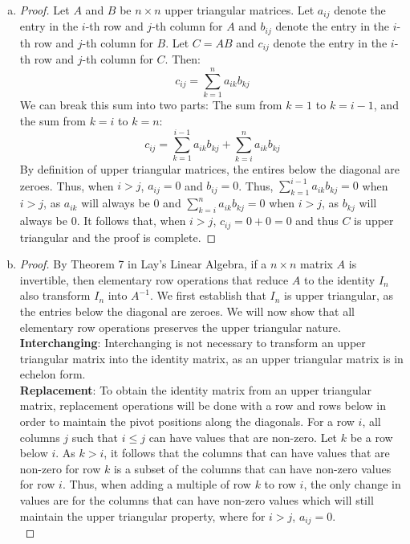 \documentclass[11pt]{scrartcl}
\theoremstyle{dotlessP}
\theoremstyle{dotlessN}
\begin{document}
\begin{enumerate}[(a)]
	\item 
		\begin{proof}
			Let $A$ and $B$ be $n \times n$ upper triangular matrices. Let $a_{ij}$ denote the entry in the $i$-th row and $j$-th column for $A$ and $b_{ij}$ denote the entry in the $i$-th row and $j$-th column for $B$. Let $C = AB$ and  $c_{ij}$ denote the entry in the $i$-th row and $j$-th column for $C$.
			Then:
			\[
				c_{ij} = \sum_{k=1}^{n} a_{ik}b_{kj}
			\] 
			We can break this sum into two parts: The sum from  $k = 1$ to $k = i-1$, and the sum from $k = i$ to $k = n$:
			\[
				c_{ij} = \sum_{k=1}^{i-1} a_{ik}b_{kj} + \sum_{k = i}^{n} a_{ik}b_{kj}
			\] 
			By definition of upper triangular matrices, the entires below the diagonal are zeroes. Thus, when $i > j$, $a_{ij} = 0$ and $b_{ij} = 0$. Thus, $\displaystyle\sum_{k=1}^{i-1} a_{ik}b_{kj} = 0$ when $i > j$, as $a_{ik}$ will always be 0 and $\displaystyle\sum_{k = i}^{n} a_{ik}b_{kj} = 0$ when $i > j$, as $b_{kj}$ will always be 0. It follows that, when $i > j$, $c_{ij} = 0 + 0 = 0$ and thus $C$ is upper triangular and the proof is complete.
		\end{proof}
	\item 
		\begin{proof}
			By Theorem 7 in Lay's Linear Algebra, if a $n \times n$ matrix $A$ is invertible, then elementary row operations that reduce $A$ to the identity $I_n$ also transform $I_n$ into $A^{-1}$. We first establish that $I_n$ is upper triangular, as the entries below the diagonal are zeroes. We will now show that all elementary row operations preserves the upper triangular nature. 
			\\

			\textbf{Interchanging}: Interchanging is not necessary to transform an upper triangular matrix into the identity matrix, as an upper triangular matrix is in echelon form.
			\\

			\textbf{Replacement}: To obtain the identity matrix from an upper triangular matrix, replacement operations will be done with a row and rows below in order to maintain the pivot positions along the diagonals. For a row $i$, all columns $j$ such that $i \leq j$ can have values that are non-zero. Let $k$ be a row below $i$. As $k > i$, it follows that the columns that can have values that are non-zero for row $k$ is a subset of the columns that can have non-zero values for row $i$. Thus, when adding a multiple of row $k$ to row $i$, the only change in values are for the columns that can have non-zero values which will still maintain the upper triangular property, where for  $i > j$, $a_{ij} = 0$.
			\\


\end{proof}
\end{enumerate}
\end{document}
